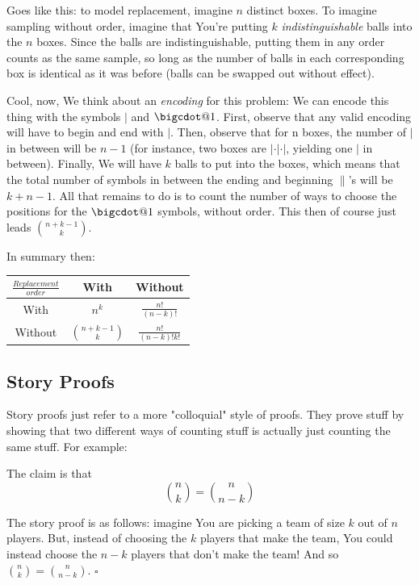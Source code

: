 \documentclass{article}
\makeatletter
\newcommand*\bigcdot{\mathpalette\bigcdot@{1}}
\newcommand*\bigcdot@[2]{\mathbin{\vcenter{\hbox{\scalebox{#2}{$\m@th#1\bullet$}}}}}
\makeatother
\begin{document}
		Goes like this: to model replacement, imagine $n$ distinct boxes. To imagine sampling without order, imagine that You're putting $k$ \textit{indistinguishable} balls into the $n$ boxes. Since the balls are indistinguishable, putting them in any order counts as the same sample, so long as the number of balls in each corresponding box is identical as it was before (balls can be swapped out without effect).
		
		Cool, now, We think about an \textit{encoding} for this problem: We can encode this thing with the symbols $\vert$ and \textbf{$\bigcdot$}. First, observe  that any valid encoding will have to begin and end with $\vert$. Then, observe that for n boxes, the number of $\vert$ in between will be $n-1$ (for instance, two boxes are $\vert \cdot \vert \cdot \vert$, yielding one $\vert$ in between). Finally, We will have $k$ balls to put into the boxes, which means that the total number of symbols in between the ending and beginning $\|$'s will be $k + n - 1$. All that remains to do is to count the number of ways to choose the positions for the $\bigcdot$ symbols, without order. This then of course just leads $\binom{n+k-1}{k}$.
		
		In summary then:
		
		\begin{center}
			\begin{tabu}{|c | c | c |}
				\hline 
				$\frac{Replacement}{order}$ & With & Without \\
				\hline
				With & $n^k$ & $\frac{n!}{(n-k)!}$ \\
				\hline
				Without & ${ n+k-1 \choose k}$ & $\frac{n!}{(n-k)!k!}$ \\
				\hline	
			\end{tabu}
		\end{center}
		
	\subsection{Story Proofs}
	
		Story proofs just refer to a more "colloquial" style of proofs. They prove stuff by showing that two different ways of counting stuff is actually just counting the same stuff. For example:
		
		The claim is that $${n \choose k} = {n \choose n-k}$$ 
		
		The story proof is as follows: imagine You are picking a team of size $k$ out of $n$ players. But, instead of choosing the $k$ players that make the team, You could instead choose the $n-k$ players that don't make the team! And so ${n \choose k} = {n \choose n-k}$. \hfill $\square$
		
\end{document}

